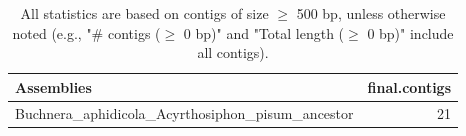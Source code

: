 \documentclass[12pt,a4paper]{article}
\begin{document}
\begin{table}[ht]
\begin{center}
\caption{All statistics are based on contigs of size $\geq$ 500 bp, unless otherwise noted (e.g., "\# contigs ($\geq$ 0 bp)" and "Total length ($\geq$ 0 bp)" include all contigs).}
\begin{tabular}{|l*{1}{|r}|}
\hline
Assemblies & final.contigs \\ \hline
Buchnera\_aphidicola\_Acyrthosiphon\_pisum\_ancestor & 21 \\ \hline
\end{tabular}
\end{center}
\end{table}
\end{document}

